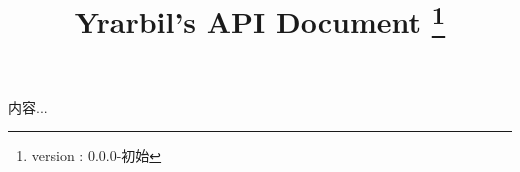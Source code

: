 \documentclass[UTF8]{ctexrep}
\title{Yrarbil's API Document \thanks{version : 0.0.0-初始}}
\begin{document}
    \maketitle
    内容...
\end{document}
